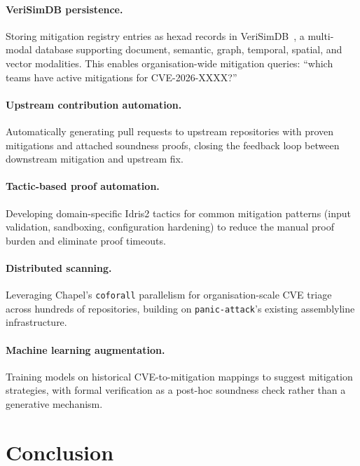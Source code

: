 \documentclass[11pt,twocolumn]{article}
\begin{document}
\paragraph{VeriSimDB persistence.} Storing mitigation registry
entries as hexad records in VeriSimDB~\cite{verisimdb}, a multi-modal
database supporting document, semantic, graph, temporal, spatial, and
vector modalities. This enables organisation-wide mitigation queries:
``which teams have active mitigations for CVE-2026-XXXX?''

\paragraph{Upstream contribution automation.} Automatically generating
pull requests to upstream repositories with proven mitigations and
attached soundness proofs, closing the feedback loop between downstream
mitigation and upstream fix.

\paragraph{Tactic-based proof automation.} Developing domain-specific
Idris2 tactics for common mitigation patterns (input validation,
sandboxing, configuration hardening) to reduce the manual proof burden
and eliminate proof timeouts.

\paragraph{Distributed scanning.} Leveraging Chapel's \texttt{coforall}
parallelism for organisation-scale CVE triage across hundreds of
repositories, building on \texttt{panic-attack}'s existing assemblyline
infrastructure.

\paragraph{Machine learning augmentation.} Training models on
historical CVE-to-mitigation mappings to suggest mitigation strategies,
with formal verification as a post-hoc soundness check rather than a
generative mechanism.

\section{Conclusion}
\label{sec:conclusion}
\end{document}
